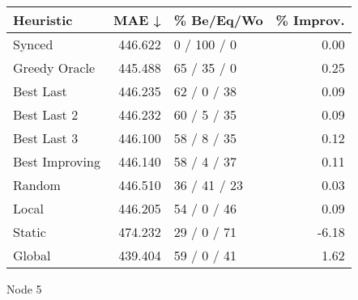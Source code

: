 \begin{tabular}{lrlr}
\toprule
\textbf{Heuristic} & \textbf{MAE ↓} & \textbf{\% Be/Eq/Wo} & \textbf{\% Improv.} \\
\midrule
            Synced &        446.622 &          0 / 100 / 0 &                0.00 \\
     Greedy Oracle &        445.488 &          65 / 35 / 0 &                0.25 \\
         Best Last &        446.235 &          62 / 0 / 38 &                0.09 \\
       Best Last 2 &        446.232 &          60 / 5 / 35 &                0.09 \\
       Best Last 3 &        446.100 &          58 / 8 / 35 &                0.12 \\
    Best Improving &        446.140 &          58 / 4 / 37 &                0.11 \\
            Random &        446.510 &         36 / 41 / 23 &                0.03 \\
             Local &        446.205 &          54 / 0 / 46 &                0.09 \\
            Static &        474.232 &          29 / 0 / 71 &               -6.18 \\
            Global &        439.404 &          59 / 0 / 41 &                1.62 \\
\bottomrule
\end{tabular}
\caption{Node 5}
\label{tab:iid_lr01_le1_bs2_5}
